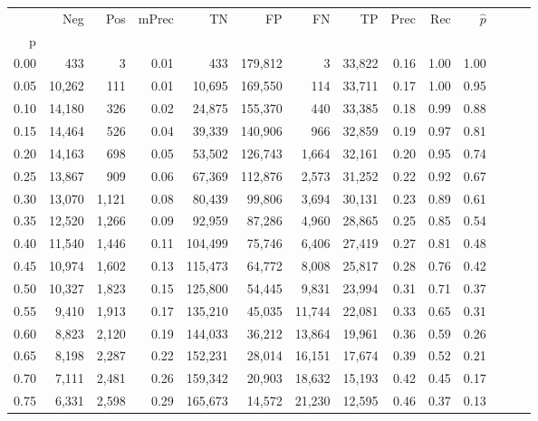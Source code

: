 \begin{tabular}{rrrrrrrrrrrrrr}
\toprule
{} &     Neg &    Pos & mPrec &       TN &       FP &      FN &      TP &  Prec &   Rec & $\hat{p}$ \\
p    &         &        &       &          &          &         &         &       &       &           \\
\midrule
0.00 &     433 &      3 &  0.01 &      433 &  179,812 &       3 &  33,822 &  0.16 &  1.00 &      1.00 \\
0.05 &  10,262 &    111 &  0.01 &   10,695 &  169,550 &     114 &  33,711 &  0.17 &  1.00 &      0.95 \\
0.10 &  14,180 &    326 &  0.02 &   24,875 &  155,370 &     440 &  33,385 &  0.18 &  0.99 &      0.88 \\
0.15 &  14,464 &    526 &  0.04 &   39,339 &  140,906 &     966 &  32,859 &  0.19 &  0.97 &      0.81 \\
0.20 &  14,163 &    698 &  0.05 &   53,502 &  126,743 &   1,664 &  32,161 &  0.20 &  0.95 &      0.74 \\
0.25 &  13,867 &    909 &  0.06 &   67,369 &  112,876 &   2,573 &  31,252 &  0.22 &  0.92 &      0.67 \\
0.30 &  13,070 &  1,121 &  0.08 &   80,439 &   99,806 &   3,694 &  30,131 &  0.23 &  0.89 &      0.61 \\
0.35 &  12,520 &  1,266 &  0.09 &   92,959 &   87,286 &   4,960 &  28,865 &  0.25 &  0.85 &      0.54 \\
0.40 &  11,540 &  1,446 &  0.11 &  104,499 &   75,746 &   6,406 &  27,419 &  0.27 &  0.81 &      0.48 \\
0.45 &  10,974 &  1,602 &  0.13 &  115,473 &   64,772 &   8,008 &  25,817 &  0.28 &  0.76 &      0.42 \\
0.50 &  10,327 &  1,823 &  0.15 &  125,800 &   54,445 &   9,831 &  23,994 &  0.31 &  0.71 &      0.37 \\
0.55 &   9,410 &  1,913 &  0.17 &  135,210 &   45,035 &  11,744 &  22,081 &  0.33 &  0.65 &      0.31 \\
0.60 &   8,823 &  2,120 &  0.19 &  144,033 &   36,212 &  13,864 &  19,961 &  0.36 &  0.59 &      0.26 \\
0.65 &   8,198 &  2,287 &  0.22 &  152,231 &   28,014 &  16,151 &  17,674 &  0.39 &  0.52 &      0.21 \\
0.70 &   7,111 &  2,481 &  0.26 &  159,342 &   20,903 &  18,632 &  15,193 &  0.42 &  0.45 &      0.17 \\
0.75 &   6,331 &  2,598 &  0.29 &  165,673 &   14,572 &  21,230 &  12,595 &  0.46 &  0.37 &      0.13 \\

\end{tabular}
